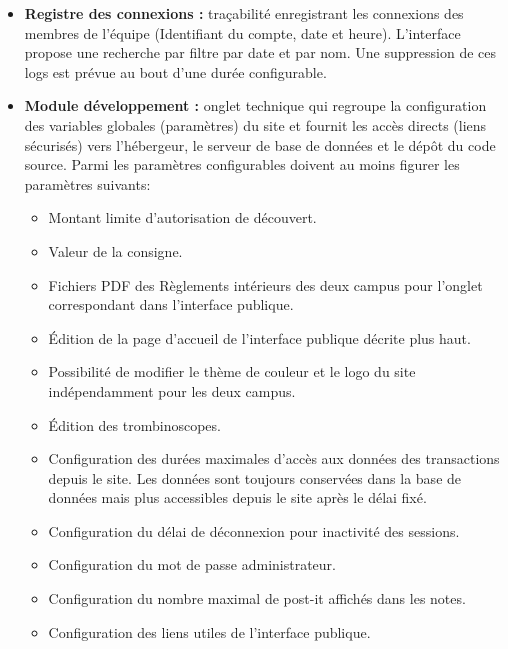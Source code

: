 \documentclass[a4paper,11pt]{article}
\begin{document}
\begin{itemize}
    \item \textbf{Registre des connexions :} traçabilité enregistrant les connexions des membres de l'équipe (Identifiant du compte, date et heure). L'interface propose une recherche par filtre par date et par nom. Une suppression  de ces logs est prévue au bout d'une durée configurable.
    \item \textbf{Module développement :} onglet technique qui regroupe la configuration des variables globales (paramètres) du site et fournit les accès directs (liens sécurisés) vers l'hébergeur, le serveur de base de données et le dépôt du code source.
    Parmi les paramètres configurables doivent au moins figurer les paramètres suivants:
    \begin{itemize}
        \item Montant limite d'autorisation de découvert.
        \item Valeur de la consigne.
        \item Fichiers PDF des Règlements intérieurs des deux campus pour l'onglet correspondant dans l'interface publique.
        \item Édition de la page d'accueil de l'interface publique décrite plus haut.
        \item Possibilité de modifier le thème de couleur et le logo du site indépendamment pour les deux campus.
        \item Édition des trombinoscopes.
        \item Configuration des durées maximales d'accès aux données des transactions depuis le site. Les données sont toujours conservées dans la base de données mais plus accessibles depuis le site après le délai fixé.
        \item Configuration du délai de déconnexion pour inactivité des sessions.
        \item Configuration du mot de passe administrateur.
        \item Configuration du nombre maximal de post-it affichés dans les notes.
        \item Configuration des liens utiles de l'interface publique.
    \end{itemize}
\end{itemize}
\end{document}
